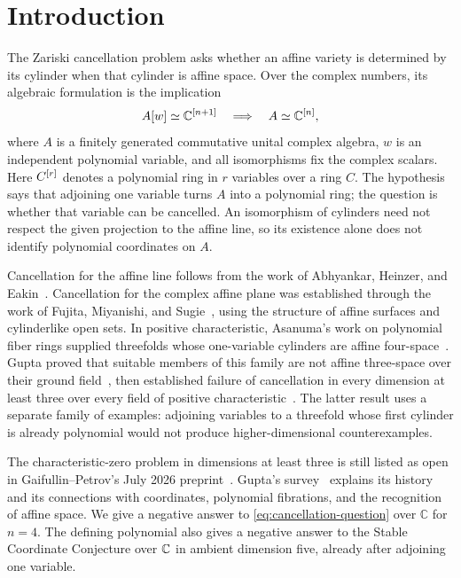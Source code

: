 \section{Introduction}
\label{sec:introduction}

The Zariski cancellation problem asks whether an affine variety is determined
by its cylinder when that cylinder is affine space. Over the complex numbers,
its algebraic formulation is the implication
\begin{equation}
 A[w]\simeq \mathbb C^{[n+1]}
 \quad\Longrightarrow\quad
 A\simeq\mathbb C^{[n]},
 \label{eq:cancellation-question}
\end{equation}
where $A$ is a finitely generated commutative unital complex algebra, $w$ is
an independent polynomial variable, and all isomorphisms fix the complex
scalars. Here $C^{[r]}$ denotes a polynomial ring in $r$ variables over a
ring $C$. The hypothesis says that adjoining one variable turns $A$ into a
polynomial ring; the question is whether that variable can be cancelled.
An isomorphism of cylinders need not respect the given projection to the
affine line, so its existence alone does not identify polynomial
coordinates on $A$.

Cancellation for the affine line follows from the work of Abhyankar,
Heinzer, and Eakin~\cite[Corollary~(2.8)]{AEH}. Cancellation for the
complex affine plane was established through the work of Fujita,
Miyanishi, and Sugie~\cite{Fujita,MiyanishiSugie}, using the structure of
affine surfaces and cylinderlike open sets. In positive characteristic,
Asanuma's work on polynomial fiber rings supplied threefolds whose
one-variable cylinders are affine four-space~\cite{Asanuma}. Gupta
proved that suitable members of this family are not affine three-space
over their ground field~\cite{GuptaThreefold}, then established failure
of cancellation in every dimension at least three over every field of
positive characteristic~\cite{GuptaPositive}. The latter result uses a
separate family of examples: adjoining variables to a threefold whose
first cylinder is already polynomial would not produce higher-dimensional
counterexamples.

The characteristic-zero problem in dimensions at least three is still
listed as open in Gaifullin--Petrov's July 2026
preprint~\cite[p.~1]{GaifullinPetrov}. Gupta's
survey~\cite{GuptaSurvey} explains its history and its connections with
coordinates, polynomial fibrations, and the recognition of affine
space. We give a negative answer to \eqref{eq:cancellation-question}
over $\mathbb C$ for $n=4$.
The defining polynomial also gives a negative answer to the Stable
Coordinate Conjecture over $\mathbb C$ in ambient dimension five, already after
adjoining one variable.


